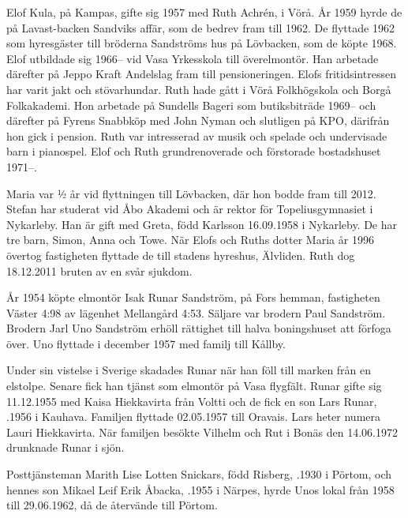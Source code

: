 Elof Kula,  på Kampas, gifte sig 1957 med Ruth Achrén,  i Vörå.  År 1959 hyrde de på Lavast-backen Sandviks affär, som de bedrev fram till 1962. De flyttade 1962 som hyresgäster till bröderna Sandströms hus på Lövbacken, som de köpte 1968. Elof utbildade sig 1966-- vid Vasa Yrkesskola till överelmontör. Han arbetade därefter på Jeppo Kraft Andelslag fram till pensioneringen. Elofs fritidsintressen har varit jakt och stövarhundar. Ruth hade gått i Vörå Folkhögskola och Borgå Folkakademi. Hon arbetade på Sundells Bageri som butiksbiträde 1969-- och därefter på Fyrens Snabbköp med John Nyman och slutligen på KPO, därifrån hon gick i pension. Ruth var intresserad av musik och spelade och undervisade barn i pianospel. Elof och Ruth grundrenoverade och förstorade bostadshuset 1971--.
\begin{jhchildren}
  \item {}
  \item {}
\end{jhchildren}
Maria var ½ år vid flyttningen till Lövbacken, där hon bodde fram till 2012. Stefan har studerat vid Åbo Akademi och är rektor för Topeliusgymnasiet i Nykarleby. Han är gift med Greta, född Karlsson 16.09.1958 i Nykarleby. De har tre barn, Simon, Anna och Towe.	När Elofs och Ruths dotter Maria år 1996 övertog fastigheten flyttade de till stadens hyreshus,  Älvliden.  Ruth dog 18.12.2011 bruten av en svår sjukdom.


År 1954 köpte elmontör Isak Runar Sandström,  på Fors hemman, fastigheten Väster 4:98 av lägenhet Mellangård 4:53. Säljare var brodern Paul Sandström. Brodern Jarl Uno Sandström erhöll rättighet till halva boningshuset att förfoga över. Uno flyttade i december 1957 med familj till Kållby.

Under sin vistelse i Sverige skadades Runar när han föll till marken från en elstolpe. Senare fick han tjänst som elmontör på Vasa flygfält. Runar gifte sig 11.12.1955 med Kaisa Hiekkavirta från Voltti och de fick en son Lars Runar, .1956 i Kauhava. Familjen flyttade 02.05.1957 till Oravais. Lars heter numera Lauri Hiekkavirta. När familjen besökte Vilhelm och Rut i Bonäs den 14.06.1972 drunknade Runar i sjön.

Posttjänsteman Marith Lise Lotten Snickars, född Risberg, .1930 i Pörtom, och hennes son Mikael Leif Erik Åbacka, .1955 i Närpes, hyrde Unos lokal från 1958 till 29.06.1962, då de återvände till Pörtom.


